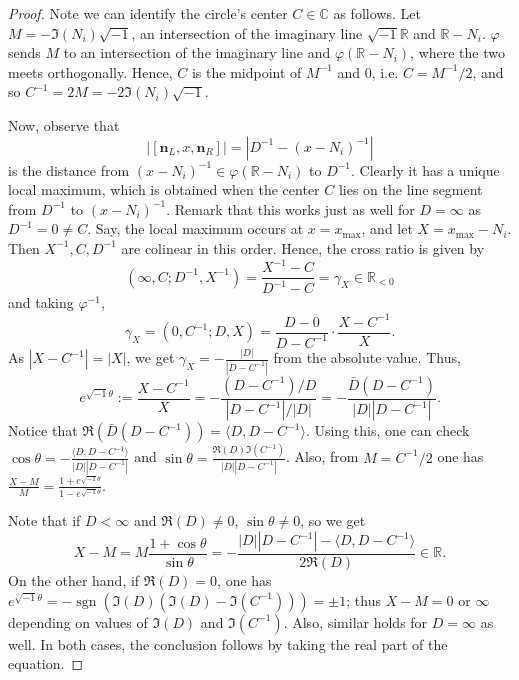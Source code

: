 \documentclass{article}
\theoremstyle{definition}
\theoremstyle{plain}
\theoremstyle{remark}
\numberwithin{equation}{section}
\newcommand{\bR}{\mathbb{R}}
\newcommand{\bC}{\mathbb{C}}
\newcommand{\abs}[1]{\left| {#1} \right|}
\newcommand{\inprod}[2]{\langle {#1}, {#2} \rangle}
\newcommand{\im}{{\sqrt{-1}}}
\DeclareMathOperator{\sgn}{sgn}
\def\nsL{{\mathbf{n}_L}}
\def\nsR{{\mathbf{n}_R}}
\begin{document}
\begin{proof}
  Note we can identify the circle's center $C \in \bC$ as follows.
  Let $M = - \Im(N_i) \im$, an intersection of the imaginary line $\im \bR$ and $\bR - N_i$.
  $\varphi$ sends $M$ to an intersection of the imaginary line and $\varphi(\bR - N_i)$,
  where the two meets orthogonally.
  Hence, $C$ is the midpoint of $M^{-1}$ and $0$, i.e. $C = M^{-1}/2$,
  and so $C^{-1} = 2M = - 2 \Im(N_i) \im$.

  Now, observe that
  \[
    \abs{[\nsL, x, \nsR]} = \abs{D^{-1} - (x - N_i)^{-1}}
  \]
  is the distance from $(x - N_i)^{-1} \in \varphi(\bR - N_i)$ to $D^{-1}$.
  Clearly it has a unique local maximum,
  which is obtained when the center $C$ lies on the line segment from $D^{-1}$ to $(x - N_i)^{-1}$.
  Remark that this works just as well for $D = \infty$ as $D^{-1} = 0 \neq C$.
  Say, the local maximum occurs at $x = x_{\max}$, and let $X = x_{\max} - N_i$.
  Then $X^{-1}, C, D^{-1}$ are colinear in this order.
  Hence, the cross ratio is given by
  \[
    (\infty, C; D^{-1}, X^{-1}) = \frac{X^{-1} - C}{D^{-1} - C} = \gamma_X \in \bR_{< 0}
  \]
  and taking $\varphi^{-1}$,
  \[
    \gamma_X = (0, C^{-1}; D, X) = \frac{D - 0}{D - C^{-1}} \cdot \frac{X - C^{-1}}{X}.
  \]
  As $\abs{X - C^{-1}} = \abs{X}$,
  we get $\gamma_X = - \frac{\abs{D}}{\abs{D - C^{-1}}}$ from the absolute value. Thus,
  \[
    e^{\im \theta} := \frac{X - C^{-1}}{X}
    = - \frac{(D - C^{-1}) / D}{\abs{D - C^{-1}} / \abs{D}}
    = - \frac{\bar{D} (D - C^{-1})}{\abs{D} \abs{D - C^{-1}}}.
  \]
  Notice that $\Re(\bar{D} (D - C^{-1})) = \inprod{D}{D - C^{-1}}$.
  Using this, one can check $\cos \theta = - \frac{\inprod{D}{D - C^{-1}}}{\abs{D} \abs{D - C^{-1}}}$
  and $\sin \theta = \frac{\Re(D) \Im(C^{-1})}{\abs{D} \abs{D - C^{-1}}}$.
  Also, from $M = C^{-1} / 2$ one has
  $\frac{X - M}{M} = \frac{1 + e^{\im \theta}}{1 - e^{\im \theta}}$.

  Note that if $D < \infty$ and $\Re(D) \neq 0$, $\sin \theta \neq 0$, so we get
  \[
    X - M = M \frac{1 + \cos \theta}{\sin \theta} = - \frac{|D| |D - C^{-1}| - \inprod{D}{D - C^{-1}}}{2 \Re(D)} \in \bR.
  \]
  On the other hand, if $\Re(D) = 0$,
  one has $e^{\im \theta} = - \sgn(\Im(D) (\Im(D) - \Im(C^{-1}))) = \pm 1$;
  thus $X - M = 0$ or $\infty$ depending on values of $\Im(D)$ and $\Im(C^{-1})$.
  Also, similar holds for $D = \infty$ as well.
  In both cases, the conclusion follows by taking the real part of the equation.
\end{proof}
\end{document}
